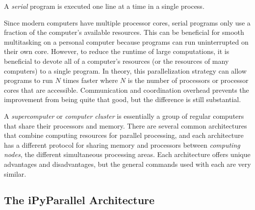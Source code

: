 A \emph{serial} program is executed one line at a time in a single process.

Since modern computers have multiple processor cores, serial programs only use a fraction of the computer's available resources.
This can be beneficial for smooth multitasking on a personal computer because programs can run uninterrupted on their own core.
However, to reduce the runtime of large computations, it is beneficial to devote all of a computer's resources (or the resources of many computers) to a single program.
In theory, this parallelization strategy can allow programs to run $N$ times faster where $N$ is the number of processors or processor cores that are accessible.
Communication and coordination overhead prevents the improvement from being quite that good, but the difference is still substantial.

A \emph{supercomputer} or \emph{computer cluster} is essentially a group of regular computers that share their processors and memory.
There are several common architectures that combine computing resources for parallel processing, and each architecture has a different protocol for sharing memory and processors between \emph{computing nodes}, the different simultaneous processing areas.
Each architecture offers unique advantages and disadvantages, but the general commands used with each are very similar.

\subsection*{The iPyParallel Architecture} %

